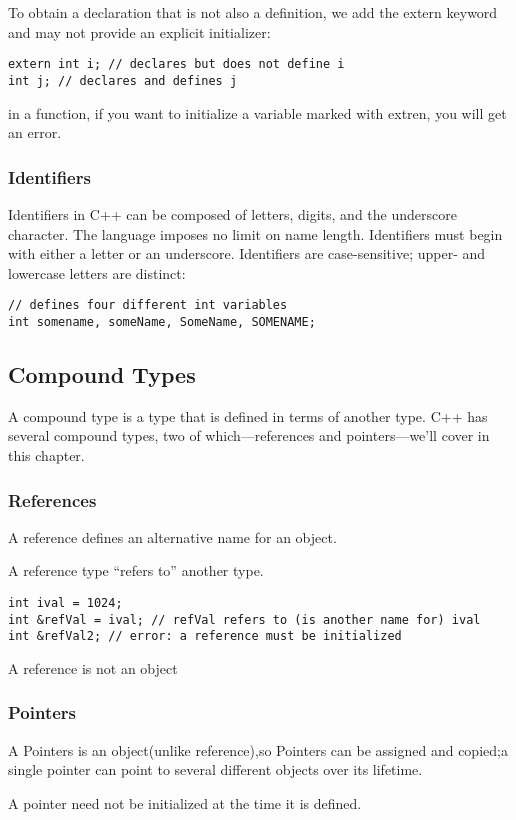 \documentclass[11pt]{article}
\begin{document}
To obtain a declaration that is not also a definition, we add the extern keyword and may not provide an explicit initializer:
\begin{verbatim}
extern int i; // declares but does not define i
int j; // declares and defines j
\end{verbatim}
in a function, if you want to initialize a variable marked with extren, you will get an error.
\subsubsection{Identifiers}
\label{sec-2-2-3}
Identifiers in C++ can be composed of letters, digits, and the underscore character. The language imposes no limit on name length. Identifiers must begin with either a letter or an underscore. Identifiers are case-sensitive; upper- and lowercase letters are distinct:
\begin{verbatim}
// defines four different int variables
int somename, someName, SomeName, SOMENAME;
\end{verbatim}
\subsection{Compound Types}
\label{sec-2-3}
A compound type is a type that is defined in terms of another type. C++ has several compound types, two of which—references and pointers—we’ll cover in this chapter.
\subsubsection{References}
\label{sec-2-3-1}
A reference defines an alternative name for an object.

A reference type “refers to” another type.

\begin{verbatim}
int ival = 1024;
int &refVal = ival; // refVal refers to (is another name for) ival 
int &refVal2; // error: a reference must be initialized
\end{verbatim}

A reference is not an object
\subsubsection{Pointers}
\label{sec-2-3-2}
A Pointers is an object(unlike reference),so Pointers can be assigned and copied;a single pointer can point to several different objects over its lifetime.

A pointer need not be initialized at the time it is defined.
\end{document}
